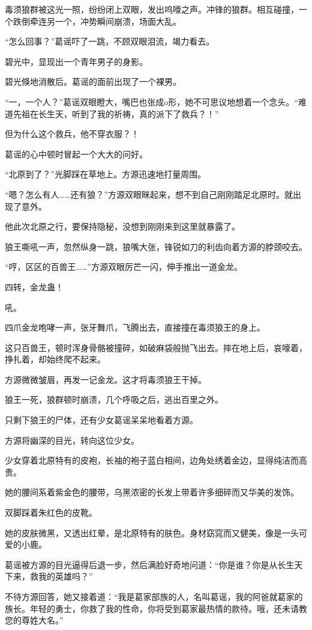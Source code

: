 \begin{this_body}
毒须狼群被这光一照，纷纷闭上双眼，发出呜嚎之声。冲锋的狼群。相互碰撞，一个跌倒牵连另一个，冲势瞬间崩溃，场面大乱。

“怎么回事？”葛谣吓了一跳，不顾双眼泪流，竭力看去。

碧光中，显现出一个青年男子的身影。

碧光倏地消散后。葛谣的面前出现了一个裸男。

“一，一个人？”葛谣双眼瞪大，嘴巴也张成o形，她不可思议地想着一个念头。“难道先祖在长生天，听到了我的祈祷，真的派下了救兵？！”

但为什么这个救兵，他不穿衣服？！

葛谣的心中顿时冒起一个大大的问好。

“北原到了？”光脚踩在草地上。方源迅速地打量周围。

“嗯？怎么有人……还有狼？”方源双眼眯起来，想不到自己刚刚踏足北原时。就出现了意外。

他此次北原之行，要保持隐秘，没想到刚刚来到这里就暴露了。

狼王嘶吼一声，忽然纵身一跳，狼嘴大张，锋锐如刀的利齿向着方源的脖颈咬去。

“哼，区区的百兽王……”方源双眼厉芒一闪，伸手推出一道金龙。

四转，金龙蛊！

吼。

四爪金龙咆哮一声，张牙舞爪，飞腾出去，直接撞在毒须狼王的身上。

这只百兽王，顿时浑身骨骼被撞碎，如破麻袋般抛飞出去。摔在地上后，哀嚎着，挣扎着，却始终爬不起来。

方源微微皱眉，再发一记金龙。这才将毒须狼王干掉。

狼王一死，狼群顿时崩溃，几个呼吸之后，逃出百里之外。

只剩下狼王的尸体，还有少女葛谣呆呆地看着方源。

方源将幽深的目光，转向这位少女。

少女穿着北原特有的皮袍，长袖的袍子蓝白相间，边角处绣着金边，显得纯洁而高贵。

她的腰间系着紫金色的腰带，乌黑浓密的长发上带着许多细碎而又华美的发饰。

双脚踩着朱红色的皮靴。

她的皮肤微黑，又透出红晕，是北原特有的肤色。身材窈窕而又健美，像是一头可爱的小鹿。

葛谣被方源的目光逼得后退一步，然后满脸好奇地问道：“你是谁？你是从长生天下来，救我的英雄吗？”

不待方源回答，她又接着道：“我是葛家部族的人，名叫葛谣，我的阿爸就葛家的族长。年轻的勇士，你救了我的性命，你将受到葛家最热情的款待。哦，还未请教您的尊姓大名。”


\end{this_body}
